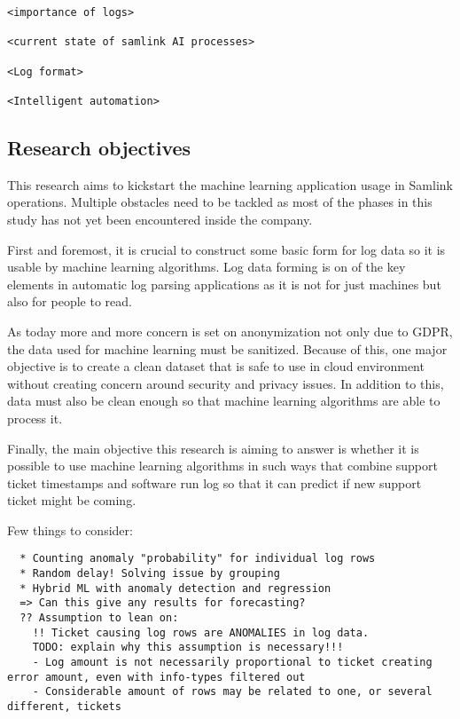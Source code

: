 \begin{verbatim}
<importance of logs>

<current state of samlink AI processes>

<Log format>

<Intelligent automation>
\end{verbatim}

\subsection{Research objectives}\label{subsec:intro-research-objectives}
This research aims to kickstart the machine learning application usage in Samlink operations.
Multiple obstacles need to be tackled
as most of the phases in this study has not yet been encountered inside the company.

First and foremost,
it is crucial to construct some basic form for log data
so it is usable by machine learning algorithms.
Log data forming is on of the key elements in automatic log parsing applications
as it is not for just machines
but also for people to read.

As today more and more concern is set on anonymization
not only due to GDPR,
the data used for machine learning must be sanitized.
Because of this,
one major objective is to create a clean dataset
that is safe to use in cloud environment
without creating concern around security and privacy issues.
In addition to this,
data must also be clean enough
so that machine learning algorithms
are able to process it.

Finally,
the main objective this research is aiming to answer
is whether it is possible to use machine learning algorithms
in such ways that combine support ticket timestamps
and software run log
so that it can predict
if new support ticket might be coming.

Few things to consider:
\begin{verbatim}
  * Counting anomaly "probability" for individual log rows
  * Random delay! Solving issue by grouping
  * Hybrid ML with anomaly detection and regression
  => Can this give any results for forecasting?
  ?? Assumption to lean on:
    !! Ticket causing log rows are ANOMALIES in log data.
    TODO: explain why this assumption is necessary!!!
    - Log amount is not necessarily proportional to ticket creating error amount, even with info-types filtered out
    - Considerable amount of rows may be related to one, or several different, tickets
\end{verbatim}

